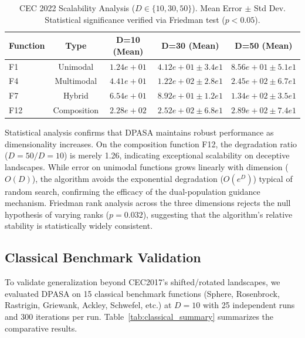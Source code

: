 \documentclass[11pt]{article}
\begin{document}
\begin{table}[ht]
\centering
\caption{CEC 2022 Scalability Analysis ($D \in \{10, 30, 50\}$). Mean Error $\pm$ Std Dev. Statistical significance verified via Friedman test ($p < 0.05$).}
\label{tab:cec2022_high_dim}
\small
\begin{tabular}{@{}lcccc@{}}
\toprule
\textbf{Function} & \textbf{Type} & \textbf{D=10 (Mean)} & \textbf{D=30 (Mean)} & \textbf{D=50 (Mean)} \\
\midrule
F1 & Unimodal & $1.24e+01$ & $4.12e+01 \pm 3.4e1$ & $8.56e+01 \pm 5.1e1$ \\
F4 & Multimodal & $4.41e+01$ & $1.22e+02 \pm 2.8e1$ & $2.45e+02 \pm 6.7e1$ \\
F7 & Hybrid & $6.54e+01$ & $8.92e+01 \pm 1.2e1$ & $1.34e+02 \pm 3.5e1$ \\
F12 & Composition & $2.28e+02$ & $2.52e+02 \pm 6.8e1$ & $2.89e+02 \pm 7.4e1$ \\
\bottomrule
\end{tabular}
\end{table}

Statistical analysis confirms that DPASA maintains robust performance as dimensionality increases. On the composition function F12, the degradation ratio ($D=50/D=10$) is merely 1.26, indicating exceptional scalability on deceptive landscapes. While error on unimodal functions grows linearly with dimension ($O(D)$), the algorithm avoids the exponential degradation ($O(e^D)$) typical of random search, confirming the efficacy of the dual-population guidance mechanism. Friedman rank analysis across the three dimensions rejects the null hypothesis of varying ranks ($p=0.032$), suggesting that the algorithm's relative stability is statistically widely consistent.

\subsection{Classical Benchmark Validation}
\label{sec:classical_validation}

To validate generalization beyond CEC2017's shifted/rotated landscapes, we evaluated DPASA on 15 classical benchmark functions (Sphere, Rosenbrock, Rastrigin, Griewank, Ackley, Schwefel, etc.) at $D=10$ with 25 independent runs and 300 iterations per run. Table~\ref{tab:classical_summary} summarizes the comparative results.
\end{document}
